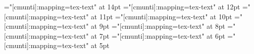 \font\fourteenit="[cmunti]:mapping=tex-text"    at 14pt
\font\twelveit="[cmunti]:mapping=tex-text"      at 12pt
\font\elevenit="[cmunti]:mapping=tex-text"      at 11pt
\font\tenit="[cmunti]:mapping=tex-text"         at 10pt
\font\nineit="[cmunti]:mapping=tex-text"        at 9pt
\font\eightit="[cmunti]:mapping=tex-text"       at 8pt
\font\sevenit="[cmunti]:mapping=tex-text"       at 7pt
\font\sixit="[cmunti]:mapping=tex-text"         at 6pt
\font\fiveit="[cmunti]:mapping=tex-text"        at 5pt



\def\sizev{
\let\rm=\fiverm
\let\bf=\fivebf
\let\it=\fiveit
\let\sfdc=\fivessdc
\let\sfbf=\fivessbf
\let\sf=\fivess
\let\sl=\fivesl
\let\tt=\fivett
\let\small=\sizev
\let\smaller=\sizev
\let\large=\sizevi
\let\Large=\sizevii
\let\LARGE=\sizeviii
\let\huge=\sizeix
\let\Huge=\sizex
\let\HUGE=\sizexi
}

\def\sizex{
\let\rm=\tenrm
\let\bf=\tenbf
\let\it=\tenit
\let\sfdc=\tenssdc
\let\sfbf=\tenssbf
\let\sf=\tenss
\let\sl=\tensl
\let\tt=\tentt
\let\small=\sizev
\let\Small=\sizev
\let\SMALL=\sizev
\let\tiny=\sizev
\let\Tiny=\sizev
\let\TINY=\sizev
\let\large=\sizexi
\let\Large=\sizexii
\let\LARGE=\sizexiv
\let\huge=\sizexvi
\let\Huge=\sizexx
\let\HUGE=\sizexiv
}

\def\sizexi{
\let\rm=\elevenrm
\let\bf=\elevenbf
\let\it=\elevenit
\let\sfdc=\elevenssdc
\let\sfbf=\elevenssbf
\let\sf=\elevenss
\let\sl=\elevensl
\let\tt=\eleventt
\let\small=\sizev
\let\Small=\sizev
\let\SMALL=\sizev
\let\tiny=\sizev
\let\Tiny=\sizev
\let\TINY=\sizev
\let\large=\sizexi
\let\Large=\sizexii
\let\LARGE=\sizexiv
\let\huge=\sizexvi
\let\Huge=\sizexx
\let\HUGE=\sizexiv
}

